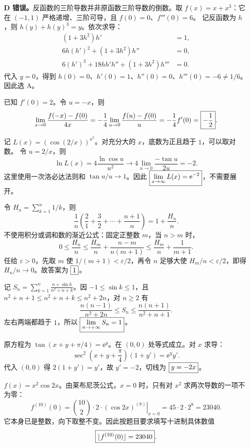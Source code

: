 \textbf{D 错误。}反函数的三阶导数并非原函数三阶导数的倒数。取 $f(x)=x+x^3$：它在 $(-1,1)$ 严格递增、三阶可导，且 $f(0)=0$、$f'''(0)=6$。
记反函数为 $h$，则 $h(y)+h(y)^3=y$。依次求导：
\begin{align*}
(1+3h^2)h'&=1,\\
6h(h')^2+(1+3h^2)h''&=0,\\
6(h')^3+18hh'h''+(1+3h^2)h'''&=0.
\end{align*}
代入 $y=0$，得到 $h(0)=0$、$h'(0)=1$、$h''(0)=0$、$h'''(0)=-6\ne1/6$。因此选 A。

已知 $f'(0)=2$。令 $u=-x$，则
\[
\lim_{x\to0}\frac{f(-x)-f(0)}{4x}
=-\frac14\lim_{u\to0}\frac{f(u)-f(0)}u
=-\frac14 f'(0)=\boxed{-\frac12}.
\]

记 $L(x)=(\cos(2/x))^{x^2}$。对充分大的 $x$，底数为正且趋于 $1$，可以取对数。
令 $u=2/x$，则
\[
\ln L(x)=4\frac{\ln\cos u}{u^2}\longrightarrow
4\lim_{u\to0}\frac{-\tan u}{2u}=-2.
\]
这里使用一次洛必达法则和 $\tan u/u\to1$。因此 $\boxed{\lim_{x\to\infty}L(x)=\mathrm e^{-2}}$，不需要展开。

\newpage
{}
令 $H_n=\sum_{k=1}^n1/k$，则
\[
\frac1n\left(\frac21+\frac32+\cdots+\frac{n+1}n\right)=1+\frac{H_n}n.
\]
不使用积分或调和数的渐近公式：固定正整数 $m$，当 $n>m$ 时，
\[
0\le\frac{H_n}n
\le\frac{H_m}n+\frac{n-m}{n(m+1)}
\le\frac{H_m}n+\frac1{m+1}.
\]
任给 $\varepsilon>0$，先取 $m$ 使 $1/(m+1)<\varepsilon/2$，再令 $n$ 足够大使 $H_m/n<\varepsilon/2$，即得 $H_n/n\to0$。故答案为 $\boxed{1}$。

记 $S_n=\sum_{k=1}^n\frac{n+\sin k}{n^2+n+k}$。因 $-1\le\sin k\le1$，且
$n^2+n+1\le n^2+n+k\le n^2+2n$，对 $n\ge2$ 有
\[
\frac{n(n-1)}{n^2+2n}\le S_n\le\frac{n(n+1)}{n^2+n+1}.
\]
左右两端都趋于 $1$，所以 $\boxed{\lim_{n\to+\infty}S_n=1}$。

原方程为 $\tan(x+y+\pi/4)=\ee^y$。在 $(0,0)$ 处等式成立。对 $x$ 求导：
\[
\sec^2\left(x+y+\frac\pi4\right)(1+y')=\ee^y y'.
\]
代入 $(0,0)$ 得 $2(1+y')=y'$，故 $y'=-2$，切线为 $\boxed{y=-2x}$。

$f(x)=x^2\cos2x$。由莱布尼茨公式，$x=0$ 时，只有对 $x^2$ 求两次导数的一项不为零：
\[
f^{(10)}(0)=\binom{10}2\cdot2\cdot\left.(\cos2x)^{(8)}\right|_{x=0}
=45\cdot2\cdot2^8=23040.
\]
它本身已是整数，向下取整不变。因此按题目要求填写十进制具体数值
\[
\boxed{\lfloor f^{(10)}(0)\rfloor=23040}.
\]

